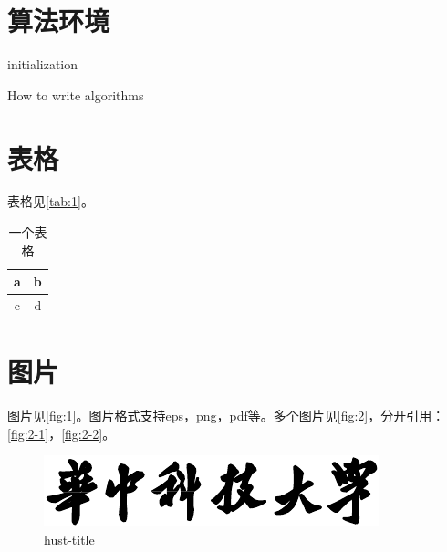 {\section{算法环境}

\begin{algorithm}[H]
\SetAlgoLined
{}
initialization\;\label{alg_line:1}
\caption{How to write algorithms}\label{alg:1}
\end{algorithm}


\section{表格}
表格见\autoref{tab:1}。

\begin{table}[!h]
\centering
\caption{一个表格}\label{tab:1}
\begin{tabular}{|c|c|}
\hline
a & b \\
\hline
c & d \\
\hline
\end{tabular}
\end{table}
\section{图片}
图片见\autoref{fig:1}。图片格式支持eps，png，pdf等。多个图片见\autoref{fig:2}，分开引用：\autoref{fig:2-1}，\autoref{fig:2-2}。

\begin{figure}[!h]
\centering
\includegraphics[width=.4\textwidth]{hust-title.pdf}
\caption{hust-title}\label{fig:hust-title}
\end{figure}

}
